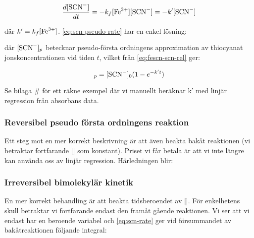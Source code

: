 \begin{equation}
  \label{eq:scn-pseudo-rate}
  \frac{d[\ce{SCN-}]}{dt} = -k_f[\ce{Fe^3+}][\ce{SCN-}] = -k'[\ce{SCN-}]
\end{equation}

där $k' = k_f[\ce{Fe^3+}]$. \cref{eq:scn-pseudo-rate} har en enkel lösning:



där $[\ce{SCN-}]_{p}$ betecknar pseudo-första ordningens approximation
av thiocyanat jonskoncentrationen vid tiden $t$, vilket från \cref{eq:fescn-scn-rel}
ger:

\begin{equation}
  [\ce{FeSCN^2+}]_{p}=[\ce{SCN-}]_0(1 - e^{-k't})
\end{equation}

Se bilaga \# för ett räkne exempel där vi manuellt beräknar k' med linjär regression
från absorbans data.

\subsubsection{Reversibel pseudo första ordningens reaktion}
\label{sec:rev_unary}
Ett steg mot en mer korrekt beskrivning är att även beakta bakåt
reaktionen (vi betraktar fortfarande [] som konstant). Priset
vi får betala är att vi inte längre kan använda oss av linjär regression.
Härledningen blir:




\subsubsection{Irreversibel bimolekylär kinetik}
\label{sec:irrev_binary}
En mer korrekt behandling är att beakta tidsberoendet av [].
För enkelhetens skull betraktar vi fortfarande endast den framåt gående reaktionen.
Vi ser att vi endast har en beroende variabel och \cref{eq:scn-rate} ger vid
försummandet av bakåtreaktionen följande integral:

